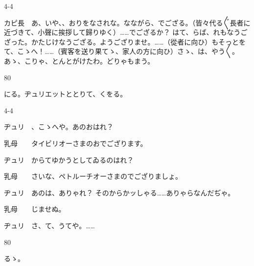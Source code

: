 \documentclass[tate,paper=b6j,jafontsize=9pt]{jlreq}
\begin{document}
\begin{azconvIndented}{4\zw}{-4\zw}

カピ長　あ、いや、、おりをなされな。なながら、でござる。（皆々代る{〴〵}長者に近づきて、小聲に挨拶して歸りゆく）……でござるか？ はて、らば、れもなうござった。かたじけなうござる。ようござりませ。……（從者に向ひ）もそっとをて、こゝへ！……（賓客を送り果てゝ、家人の方に向ひ）さゝ、は、やう{〳〵}。あゝ、こりゃ、とんとがけたわ。どりゃもまう。

\end{azconvIndented}
\begin{azconvIndented}{8\zw}{0\zw}

にる。ヂュリエットととりて、くをる。

\end{azconvIndented}
\begin{azconvIndented}{4\zw}{-4\zw}

ヂュリ　、こゝへや。あのおはれ？

乳母　　タイビリオーさまのおでござります。

ヂュリ　からてゆかうとしてゐるのはれ？

乳母　　さいな、ペトルーチオーさまのでござりましょ。

ヂュリ　あのは、ありゃれ？ そのからかッしゃる……ありゃらなんだぢゃ。

乳母　　じませぬ。

ヂュリ　さ、て、うてや。……

\end{azconvIndented}
\begin{azconvIndented}{8\zw}{0\zw}

るゝ。

\end{azconvIndented}
\end{document}
